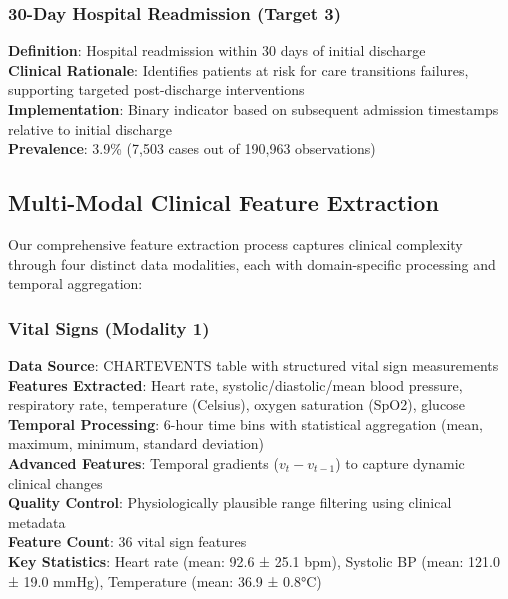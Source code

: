 \documentclass[11pt]{article}
\begin{document}
\subsubsection{30-Day Hospital Readmission (Target 3)}
\textbf{Definition}: Hospital readmission within 30 days of initial discharge
\\
\textbf{Clinical Rationale}: Identifies patients at risk for care transitions failures, supporting targeted post-discharge interventions
\\
\textbf{Implementation}: Binary indicator based on subsequent admission timestamps relative to initial discharge
\\
\textbf{Prevalence}: 3.9\% (7,503 cases out of 190,963 observations)

\subsection{Multi-Modal Clinical Feature Extraction}

Our comprehensive feature extraction process captures clinical complexity through four distinct data modalities, each with domain-specific processing and temporal aggregation:

\subsubsection{Vital Signs (Modality 1)}
\textbf{Data Source}: CHARTEVENTS table with structured vital sign measurements
\\
\textbf{Features Extracted}: Heart rate, systolic/diastolic/mean blood pressure, respiratory rate, temperature (Celsius), oxygen saturation (SpO2), glucose
\\
\textbf{Temporal Processing}: 6-hour time bins with statistical aggregation (mean, maximum, minimum, standard deviation)
\\
\textbf{Advanced Features}: Temporal gradients ($v_t - v_{t-1}$) to capture dynamic clinical changes
\\
\textbf{Quality Control}: Physiologically plausible range filtering using clinical metadata
\\
\textbf{Feature Count}: 36 vital sign features
\\
\textbf{Key Statistics}: Heart rate (mean: 92.6 ± 25.1 bpm), Systolic BP (mean: 121.0 ± 19.0 mmHg), Temperature (mean: 36.9 ± 0.8°C)
\end{document}
